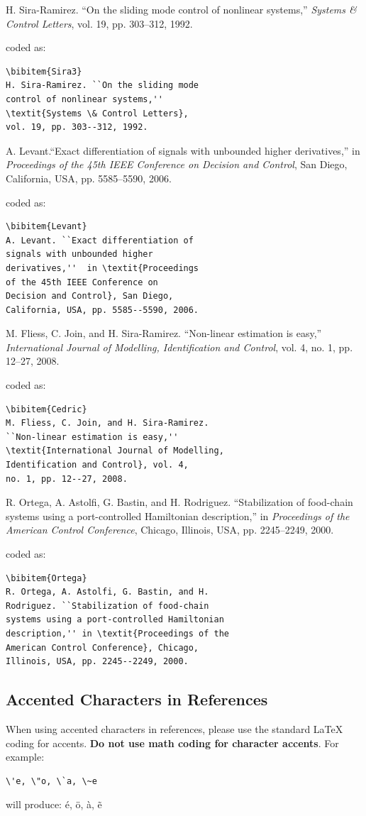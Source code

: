 \documentclass[lettersize,journal]{IEEEtran}
\begin{document}
\noindent [6] H. Sira-Ramirez. ``On the sliding mode control of nonlinear systems,'' \textit{Systems \& Control Letters}, vol. 19, pp. 303--312, 1992.

\noindent coded as:
\begin{verbatim}
\bibitem{Sira3}
H. Sira-Ramirez. ``On the sliding mode 
control of nonlinear systems,'' 
\textit{Systems \& Control Letters}, 
vol. 19, pp. 303--312, 1992.
\end{verbatim}

\noindent [7] A. Levant.``Exact differentiation of signals with unbounded higher derivatives,''  in \textit{Proceedings of the 45th IEEE Conference on Decision and Control}, San Diego, California, USA, pp. 5585--5590, 2006.

\noindent coded as:
\begin{verbatim}\bibitem{Levant}
A. Levant. ``Exact differentiation of 
signals with unbounded higher 
derivatives,''  in \textit{Proceedings 
of the 45th IEEE Conference on 
Decision and Control}, San Diego, 
California, USA, pp. 5585--5590, 2006.
\end{verbatim}


\noindent [8] M. Fliess, C. Join, and H. Sira-Ramirez. ``Non-linear estimation is easy,'' \textit{International Journal of Modelling, Identification and Control}, vol. 4, no. 1, pp. 12--27, 2008.

\noindent coded as:
\begin{verbatim}
\bibitem{Cedric}
M. Fliess, C. Join, and H. Sira-Ramirez. 
``Non-linear estimation is easy,'' 
\textit{International Journal of Modelling, 
Identification and Control}, vol. 4, 
no. 1, pp. 12--27, 2008.
\end{verbatim}

\noindent [9] R. Ortega, A. Astolfi, G. Bastin, and H. Rodriguez. ``Stabilization of food-chain systems using a port-controlled Hamiltonian description,'' in \textit{Proceedings of the American Control Conference}, Chicago, Illinois, USA, pp. 2245--2249, 2000.

\noindent coded as:
\begin{verbatim}
\bibitem{Ortega}
R. Ortega, A. Astolfi, G. Bastin, and H. 
Rodriguez. ``Stabilization of food-chain 
systems using a port-controlled Hamiltonian 
description,'' in \textit{Proceedings of the 
American Control Conference}, Chicago, 
Illinois, USA, pp. 2245--2249, 2000.
\end{verbatim}

\subsection{Accented Characters in References}
\noindent When using accented characters in references, please use the standard LaTeX coding for accents. {\bf{Do not use math coding for character accents}}. For example:
\begin{verbatim}
\'e, \"o, \`a, \~e 
\end{verbatim}
will produce: \'e, \"o, \`a, \~e 
\end{document}
